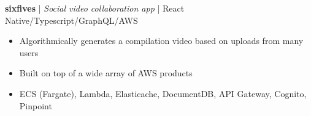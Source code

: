 \textbf{sixfives} | \textit{Social video collaboration app} | {React Native/Typescript/GraphQL/AWS}
\begin{itemize}
    \item Algorithmically generates a compilation video based on uploads from many users
    \item Built on top of a wide array of AWS products
    \item ECS (Fargate), Lambda, Elasticache, DocumentDB, API Gateway, Cognito, Pinpoint
\end{itemize}
